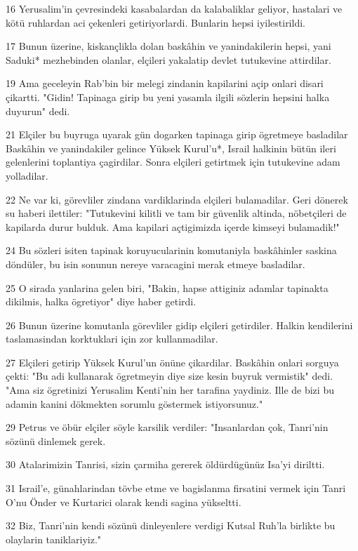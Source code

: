 \par 16 Yerusalim'in çevresindeki kasabalardan da kalabaliklar geliyor, hastalari ve kötü ruhlardan aci çekenleri getiriyorlardi. Bunlarin hepsi iyilestirildi.
\par 17 Bunun üzerine, kiskançlikla dolan baskâhin ve yanindakilerin hepsi, yani Saduki* mezhebinden olanlar, elçileri yakalatip devlet tutukevine attirdilar.
\par 19 Ama geceleyin Rab'bin bir melegi zindanin kapilarini açip onlari disari çikartti. "Gidin! Tapinaga girip bu yeni yasamla ilgili sözlerin hepsini halka duyurun" dedi.
\par 21 Elçiler bu buyruga uyarak gün dogarken tapinaga girip ögretmeye basladilar Baskâhin ve yanindakiler gelince Yüksek Kurul'u*, Israil halkinin bütün ileri gelenlerini toplantiya çagirdilar. Sonra elçileri getirtmek için tutukevine adam yolladilar.
\par 22 Ne var ki, görevliler zindana vardiklarinda elçileri bulamadilar. Geri dönerek su haberi ilettiler: "Tutukevini kilitli ve tam bir güvenlik altinda, nöbetçileri de kapilarda durur bulduk. Ama kapilari açtigimizda içerde kimseyi bulamadik!"
\par 24 Bu sözleri isiten tapinak koruyucularinin komutaniyla baskâhinler saskina döndüler, bu isin sonunun nereye varacagini merak etmeye basladilar.
\par 25 O sirada yanlarina gelen biri, "Bakin, hapse attiginiz adamlar tapinakta dikilmis, halka ögretiyor" diye haber getirdi.
\par 26 Bunun üzerine komutanla görevliler gidip elçileri getirdiler. Halkin kendilerini taslamasindan korktuklari için zor kullanmadilar.
\par 27 Elçileri getirip Yüksek Kurul'un önüne çikardilar. Baskâhin onlari sorguya çekti: "Bu adi kullanarak ögretmeyin diye size kesin buyruk vermistik" dedi. "Ama siz ögretinizi Yerusalim Kenti'nin her tarafina yaydiniz. Ille de bizi bu adamin kanini dökmekten sorumlu göstermek istiyorsunuz."
\par 29 Petrus ve öbür elçiler söyle karsilik verdiler: "Insanlardan çok, Tanri'nin sözünü dinlemek gerek.
\par 30 Atalarimizin Tanrisi, sizin çarmiha gererek öldürdügünüz Isa'yi diriltti.
\par 31 Israil'e, günahlarindan tövbe etme ve bagislanma firsatini vermek için Tanri O'nu Önder ve Kurtarici olarak kendi sagina yükseltti.
\par 32 Biz, Tanri'nin kendi sözünü dinleyenlere verdigi Kutsal Ruh'la birlikte bu olaylarin taniklariyiz."
